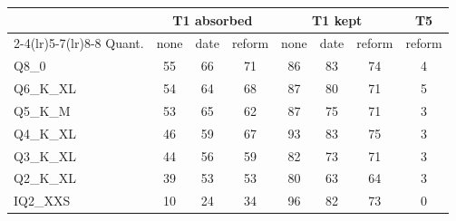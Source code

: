 \begin{tabular}{@{}l ccc ccc c@{}}
\toprule
 & \multicolumn{3}{c}{T1 absorbed} & \multicolumn{3}{c}{T1 kept} & T5 \\
\cmidrule(lr){2-4}\cmidrule(lr){5-7}\cmidrule(lr){8-8}
Quant. & none & date & reform & none & date & reform & reform \\
\midrule
Q8\_0 & 55 & 66 & 71 & 86 & 83 & 74 & 4 \\
Q6\_K\_XL & 54 & 64 & 68 & 87 & 80 & 71 & 5 \\
Q5\_K\_M & 53 & 65 & 62 & 87 & 75 & 71 & 3 \\
Q4\_K\_XL & 46 & 59 & 67 & 93 & 83 & 75 & 3 \\
Q3\_K\_XL & 44 & 56 & 59 & 82 & 73 & 71 & 3 \\
Q2\_K\_XL & 39 & 53 & 53 & 80 & 63 & 64 & 3 \\
IQ2\_XXS & 10 & 24 & 34 & 96 & 82 & 73 & 0 \\
\bottomrule
\end{tabular}
